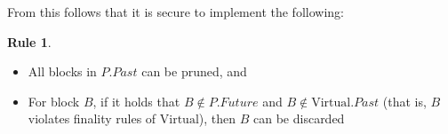 \documentclass{article}
\theoremstyle{plain}
\theoremstyle{definition}
\newtheorem{rule2}[]{Rule}
\theoremstyle{remark}
\newcommand{\virt}{\mbox{Virtual}}
\begin{document}
From this follows that it is secure to implement the following:

\begin{rule2} 
    \hfill
    \begin{itemize}
        \item All blocks in $P.Past$ can be pruned, and
        \item For block $B$, if it holds that $B\notin P.Future$ and $B\notin \virt.Past$ (that is, $B$ violates finality rules of $\virt$), then $B$ can be discarded 
    \end{itemize}
\end{rule2}



\end{document}

